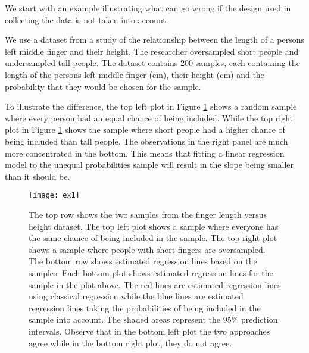 \documentclass{article}
\begin{document}
We start
with an example illustrating what can go wrong if the design used in collecting
the data is not taken into account.


\begin{example} \label{ex:anthuneq}

We use a dataset from a study of the relationship between the length of a persons left middle finger and their height. 
The researcher oversampled short people and undersampled tall people.
The dataset contains 200 samples, each containing the length of the persons left
middle finger (cm), their height (cm) and the probability that they would be
chosen for the sample.

To illustrate the difference, the top left plot in Figure \ref{fig:ex1} shows a random sample where every
person had an equal chance of being included. While the top right plot in Figure
\ref{fig:ex1} shows the sample
where short people had a higher chance of being included than tall people. The
observations in the right panel are much more concentrated in the bottom.
This means that fitting a linear regression model to the unequal probabilities
sample will result in the slope being smaller than it should be.

\begin{figure}
  \centering
  
  \texttt{[image: ex1]}

  \caption{The top row shows the two samples from the finger length versus
    height dataset. The top left plot shows a sample where everyone has the
    same chance of being included in the sample.
    The top right plot shows a sample where people with short fingers are
    oversampled. The bottom row shows estimated regression lines based on the
    samples. Each bottom plot shows estimated
    regression lines for the sample in the plot above. The red lines are
    estimated regression lines using classical regression while the blue lines
    are estimated
    regression lines taking the probabilities of being included in the sample
    into account. The shaded areas represent the 95\% prediction intervals.
    Observe that in the bottom left plot the two approaches agree while in the
    bottom right plot, they do not agree.}

  \label{fig:ex1}
\end{figure}


\end{example}
\end{document}
